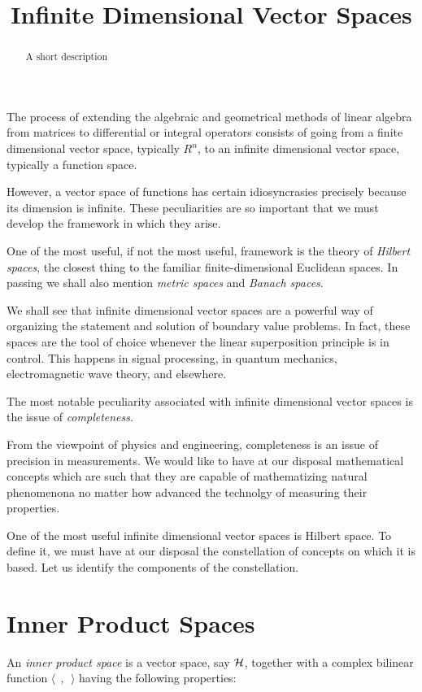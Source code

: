 \documentclass{ximera}
\title{Infinite Dimensional Vector Spaces}
\begin{document}
\begin{abstract}
A short description
\end{abstract}
\maketitle
The process of extending the algebraic and geometrical methods of
linear algebra from matrices to differential or integral operators
consists of going from a finite dimensional vector space, typically
$R^n$, to an infinite dimensional vector space, typically a function
space.

However, a vector space of functions has certain idiosyncrasies
precisely because its dimension is infinite.  These peculiarities are
so important that we must develop the framework in which they arise.

One of the most useful, if not the most useful, framework is the
theory of \emph{Hilbert spaces}, the closest thing to the familiar
finite-dimensional Euclidean spaces. In passing we shall also mention
\emph{metric spaces} and \emph{Banach spaces}.

We shall see that infinite dimensional vector spaces are a powerful
way of organizing the statement and solution of boundary value
problems.  In fact, these spaces are the tool of choice whenever the
linear superposition principle is in control. This happens in signal
processing, in quantum mechanics, electromagnetic wave theory, and
elsewhere.

The most notable peculiarity associated with infinite dimensional vector 
spaces is the issue of \emph{completeness}.

From the viewpoint of physics and engineering, completeness is an
issue of precision in measurements.  We would like to have at our
disposal mathematical concepts which are such that they are capable of
mathematizing natural phenomenona no matter how advanced the technolgy
of measuring their properties.

One of the most useful infinite dimensional vector spaces is Hilbert space.  
To define it, we must have at our disposal the constellation of concepts on 
which it is based.  Let us identify the components of the constellation.

\section{Inner Product Spaces}\label{IPS}

An \emph{inner product space} is a vector space, say $\cal H$, together with 
a complex bilinear function $\langle~~,~~\rangle$ having the following 
properties:
\end{document}
